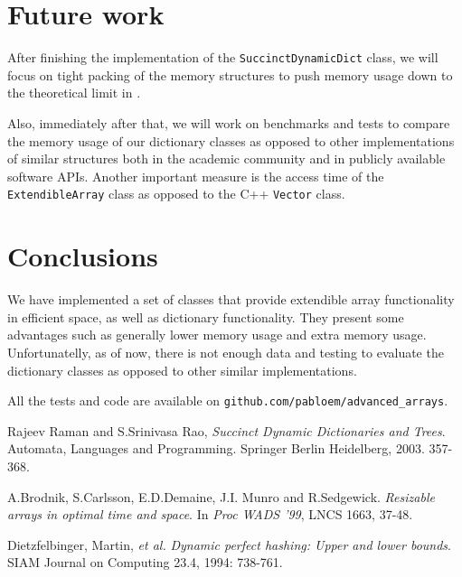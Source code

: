 \documentclass[10pt,a4paper]{article}
\begin{document}
\section{Future work}
After finishing the implementation of the \texttt{SuccinctDynamicDict} class, we will focus
on tight packing of the memory structures to push memory usage down to the
theoretical limit in \cite{ramansatti2003}.

Also, immediately after that, we will work on benchmarks and tests to
 compare the memory usage of our dictionary classes as opposed to other
 implementations of similar structures both in the academic community and in 
publicly available software APIs. Another important measure is the access
time of the \texttt{ExtendibleArray} class as opposed to the C++ \texttt{Vector}
class.

\section{Conclusions}
We have implemented a set of classes that provide extendible array functionality in 
efficient space, as well as dictionary functionality. They present some advantages
such as generally lower memory usage and extra memory usage. Unfortunatelly, as of
now, there is not enough data and testing to evaluate the dictionary classes as
opposed to other similar implementations.

All the tests and code are available on \texttt{github.com/pabloem/advanced\_arrays}.

\begin{thebibliography}{9}
 Rajeev Raman and S.Srinivasa Rao,
  \emph{Succinct Dynamic Dictionaries and Trees}.
  Automata, Languages and Programming. 
  Springer Berlin Heidelberg, 2003. 357-368.

 A.Brodnik, S.Carlsson, E.D.Demaine, J.I. Munro and R.Sedgewick.
  \emph{Resizable arrays in optimal time and space}. 
  In \emph{Proc WADS '99}, LNCS 1663, 37-48.

 Dietzfelbinger, Martin, \textit{et al.}
  \emph{Dynamic perfect hashing: Upper and lower bounds}.
  SIAM Journal on Computing 23.4, 1994: 738-761.

\end{thebibliography}
\end{document}
